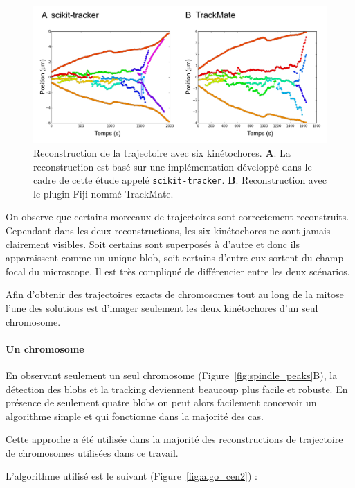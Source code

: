 \documentclass[12pt,a4paper,twoside,openright]{book}
\let\oldparagraph\paragraph
\renewcommand{\paragraph}[1]{\oldparagraph{#1}\mbox{}}
\begin{document}
\begin{figure}[htbp]
\centering
\includegraphics{figures/results/imaging/ndc80.png}
\caption[Reconstruction de la trajectoire avec six kinétochores]{\label{fig:ndc80}Reconstruction
de la trajectoire avec six kinétochores. \textbf{A}. La reconstruction
est basé sur une implémentation développé dans le cadre de cette étude
appelé \texttt{scikit-tracker}. \textbf{B}. Reconstruction avec le
plugin Fiji nommé TrackMate.}
\end{figure}

On observe que certains morceaux de trajectoires sont correctement
reconstruits. Cependant dans les deux reconstructions, les six
kinétochores ne sont jamais clairement visibles. Soit certains sont
superposés à d'autre et donc ils apparaissent comme un unique blob, soit
certains d'entre eux sortent du champ focal du microscope. Il est très
compliqué de différencier entre les deux scénarios.

Afin d'obtenir des trajectoires exacts de chromosomes tout au long de la
mitose l'une des solutions est d'imager seulement les deux kinétochores
d'un seul chromosome.

\paragraph{Un chromosome}\label{un-chromosome}

En observant seulement un seul chromosome
(Figure~\ref{fig:spindle_peaks}B), la détection des blobs et la tracking
deviennent beaucoup plus facile et robuste. En présence de seulement
quatre blobs on peut alors facilement concevoir un algorithme simple et
qui fonctionne dans la majorité des cas.

Cette approche a été utilisée dans la majorité des reconstructions de
trajectoire de chromosomes utilisées dans ce travail.

L'algorithme utilisé est le suivant (Figure~\ref{fig:algo_cen2}) :
\end{document}
